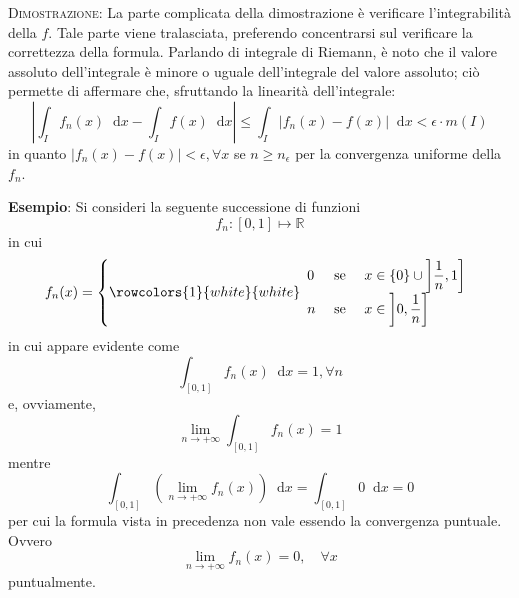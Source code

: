 \documentclass[a4paper]{extarticle}
\newcommand*\dif{\mathop{}\!\mathrm{d}}
\begin{document}
\newpage
\noindent
\normalfont \normalsize
\textsc{Dimostrazione}: La parte complicata della dimostrazione è verificare l'integrabilità della $f$. Tale parte viene tralasciata, preferendo concentrarsi sul verificare la correttezza della formula. Parlando di integrale di Riemann, è noto che il valore assoluto dell'integrale è minore o uguale dell'integrale del valore assoluto; ciò permette di affermare che, sfruttando la linearità dell'integrale:
\[\left \vert \int_I f_n(x) \dif x - \int_I f(x) \dif x \right \vert \leq \int_I \left \vert f_n(x) - f(x) \right \vert \dif x < \epsilon \cdot m(I)\]
in quanto $\left \vert f_n(x) - f(x) \right \vert < \epsilon, \forall x$ se $n \geq n_\epsilon$ per la convergenza uniforme della $f_n$.

\vspace{2em}
\noindent
\textbf{Esempio}: Si consideri la seguente successione di funzioni
\[f_n : [0,1] \longmapsto \mathbb{R}\]
in cui
\[f_n(x) = \left\{
    \rowcolors{1}{white}{white}
    \begin{array}{lll}
        0 & \text{ se } & x \in \{0\} \cup \left]\dfrac{1}{n},1\right]\\
        n & \text{ se } & x \in \left]0,\dfrac{1}{n}\right]
    \end{array}
\right.\]
in cui appare evidente come
\[\int_{[0,1]} f_n(x) \dif x = 1, \forall n\]
e, ovviamente,
\[\lim_{n \to +\infty} \int_{[0,1]} f_n(x) = 1\]
mentre
\[\int_{[0,1]} \left(\lim_{n \to +\infty} f_n(x) \right) \dif x = \int_{[0,1]} 0 \dif x = 0\]
per cui la formula vista in precedenza non vale essendo la convergenza puntuale. Ovvero
\[\lim_{n \to +\infty} f_n(x) = 0, \hspace{1em} \forall x\]
puntualmente.
\end{document}
